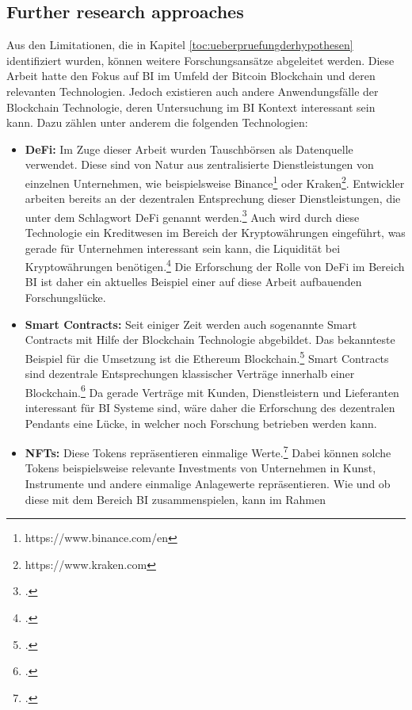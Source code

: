 \subsection{Further research approaches} \label{toc:ausblick}

Aus den Limitationen, die in Kapitel \ref{toc:ueberpruefungderhypothesen} identifiziert wurden, können weitere
Forschungsansätze abgeleitet werden. Diese Arbeit hatte den Fokus auf \ac{BI} im Umfeld der Bitcoin Blockchain und deren
relevanten Technologien. Jedoch existieren auch andere Anwendungsfälle der Blockchain Technologie, deren Untersuchung im
\ac{BI} Kontext interessant sein kann. Dazu zählen unter anderem die folgenden Technologien:
\begin{itemize}
    \item \textbf{\ac{DeFi}: }Im Zuge dieser Arbeit wurden Tauschbörsen als Datenquelle verwendet. Diese sind von Natur
    aus zentralisierte Dienstleistungen von einzelnen Unternehmen, wie beispielsweise Binance\footnote{https://www.binance.com/en}
    oder Kraken\footnote{https://www.kraken.com}. Entwickler arbeiten bereits an der dezentralen Entsprechung dieser
    Dienstleistungen, die unter dem Schlagwort \ac{DeFi} genannt werden.\footcite[Cf.][]{wiesflecker2021trends} Auch wird
    durch diese Technologie ein Kreditwesen im Bereich der Kryptowährungen eingeführt, was gerade für Unternehmen interessant
    sein kann, die Liquidität bei Kryptowährungen benötigen.\footcite[Cf.][]{wiesflecker2021trends} Die
    Erforschung der Rolle von \ac{DeFi} im Bereich \ac{BI} ist daher ein aktuelles Beispiel einer auf diese Arbeit
    aufbauenden Forschungslücke.
    \item \textbf{Smart Contracts: }Seit einiger Zeit werden auch sogenannte Smart Contracts mit Hilfe der Blockchain
    Technologie abgebildet. Das bekannteste Beispiel für die Umsetzung ist die Ethereum
    Blockchain.\footcite[Cf.][]{wiesflecker2021trends} Smart Contracts sind dezentrale Entsprechungen klassischer Verträge
    innerhalb einer Blockchain.\footcite[Cf.][]{wiesflecker2021trends} Da gerade Verträge mit Kunden, Dienstleistern
    und Lieferanten interessant für \ac{BI} Systeme sind, wäre daher die Erforschung des dezentralen Pendants eine
    Lücke, in welcher noch Forschung betrieben werden kann.
    \item \textbf{\acp{NFT}: }Diese Tokens repräsentieren einmalige Werte.\footcite[Cf.][]{wiesflecker2021trends} 
    Dabei können solche Tokens beispielsweise relevante Investments von Unternehmen in Kunst, Instrumente
    und andere einmalige Anlagewerte repräsentieren. Wie und ob diese mit dem Bereich \ac{BI} zusammenspielen, kann im Rahmen

\end{itemize}
